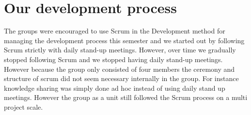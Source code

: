 \section{Our development process}
The groups were encouraged to use Scrum in the \giraf Development method for managing the development process this semester and we started out by following Scrum strictly with daily stand-up meetings. However, over time we gradually stopped following Scrum and we stopped having daily stand-up meetings. However because the group only consisted of four members the ceremony and structure of scrum did not seem necessary internally in the group. For instance knowledge sharing was simply done ad hoc instead of using daily stand up meetings. However the group as a unit still followed the Scrum process on a multi project scale.

